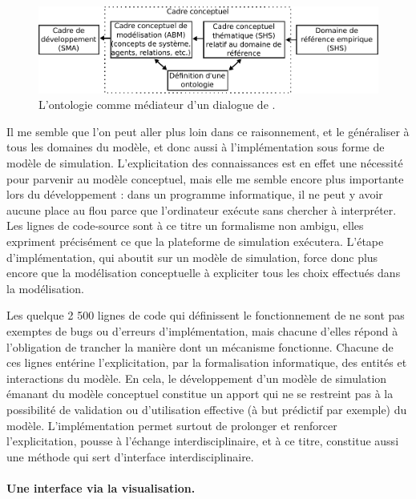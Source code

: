 \begin{figure}[H]
	\centering
	\includegraphics[width=\linewidth]{img/schema_phan.pdf}
	\caption[\og L'ontologie comme médiateur d'un dialogue \fg{} de \textcite{phan_ontologies_2014}]{\og L'ontologie comme médiateur d'un dialogue \fg{} de \textcite[fig. 2.7, \ppno~68]{phan_ontologies_2014}.}
	\label{fig:ontologie-mediateur}
\end{figure}

Il me semble que l'on peut aller plus loin dans ce raisonnement, et le généraliser à tous les domaines du modèle, et donc aussi à l'implémentation sous forme de modèle de simulation.
L'explicitation des connaissances est en effet une nécessité pour parvenir au modèle conceptuel, mais elle me semble encore plus importante lors du développement :
	dans un programme informatique, il ne peut y avoir aucune place au flou parce que l'ordinateur exécute sans chercher à interpréter.
Les lignes de code-source sont à ce titre un formalisme non ambigu, elles expriment précisément ce que la plateforme de simulation exécutera.
L'étape d'implémentation, qui aboutit sur un modèle de simulation, force donc plus encore que la modélisation conceptuelle à expliciter tous les choix effectués dans la modélisation.

Les quelque 2 500 lignes de code qui définissent le fonctionnement de \simfeodal{} ne sont pas exemptes de bugs ou d'erreurs d'implémentation, mais chacune d'elles répond à l'obligation de trancher la manière dont un mécanisme fonctionne.
Chacune de ces lignes entérine l'explicitation, par la formalisation informatique, des entités et interactions du modèle.
En cela, le développement d'un modèle de simulation émanant du modèle conceptuel constitue un apport qui ne se restreint pas à la possibilité de validation ou d'utilisation effective (à but prédictif par exemple) du modèle.
L'implémentation permet surtout de prolonger et renforcer l'explicitation, pousse à l'échange interdisciplinaire, et à ce titre, constitue aussi une méthode qui sert d'interface interdisciplinaire.

\paragraph{Une interface via la visualisation.}

